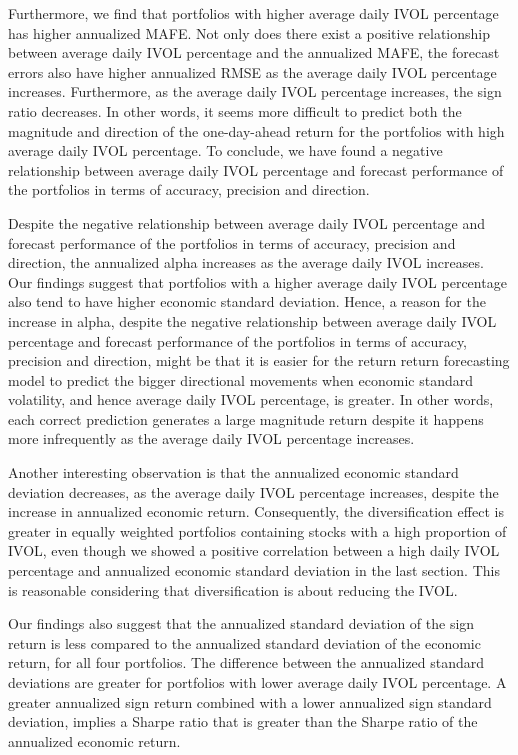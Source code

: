 Furthermore, we find that portfolios with higher average daily IVOL percentage has higher annualized MAFE. Not only does there exist a positive relationship between average daily IVOL percentage and the annualized MAFE, the forecast errors also have higher annualized RMSE as the average daily IVOL percentage increases. Furthermore, as the average daily IVOL percentage increases, the sign ratio decreases. In other words, it seems more difficult to predict both the magnitude and direction of the one-day-ahead return for the portfolios with high average daily IVOL percentage. To conclude, we have found a negative relationship between average daily IVOL percentage and forecast performance of the portfolios in terms of accuracy, precision and direction. 

Despite the negative relationship between average daily IVOL percentage and forecast performance of the portfolios in terms of accuracy, precision and direction, the annualized alpha increases as the average daily IVOL increases. Our findings suggest that portfolios with a higher average daily IVOL percentage also tend to have higher economic standard deviation. Hence, a reason for the increase in alpha, despite the negative relationship between average daily IVOL percentage and forecast performance of the portfolios in terms of accuracy, precision and direction, might be that it is easier for the return return forecasting model to predict the bigger directional movements when economic standard volatility, and hence average daily IVOL percentage, is greater. In other words, each correct prediction generates a large magnitude return despite it happens more infrequently as the average daily IVOL percentage increases.

Another interesting observation is that the annualized economic standard deviation decreases, as the average daily IVOL percentage increases, despite the increase in annualized economic return. Consequently, the diversification effect is greater in equally weighted portfolios containing stocks with a high proportion of IVOL, even though we showed a positive correlation between a high daily IVOL percentage and annualized economic standard deviation in the last section. This is reasonable considering that diversification is about reducing the IVOL.

Our findings also suggest that the annualized standard deviation of the sign return is less compared to the annualized standard deviation of the economic return, for all four portfolios. The difference between the annualized standard deviations are greater for portfolios with lower average daily IVOL percentage. A greater annualized sign return combined with a lower annualized sign standard deviation, implies a Sharpe ratio that is greater than the Sharpe ratio of the annualized economic return. 

